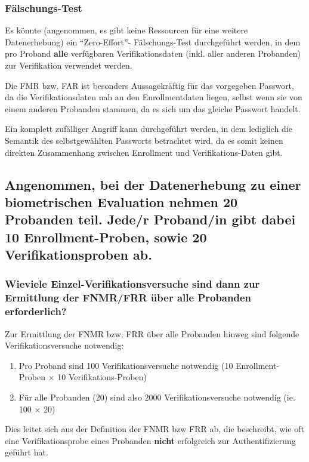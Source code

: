 \documentclass{article}
\begin{document}
\subsubsection*{Fälschungs-Test}

Es könnte (angenommen, es gibt keine Ressourcen für eine weitere Datenerhebung) ein ``Zero-Effort''-
Fälschungs-Test durchgeführt werden, in dem pro Proband \textbf{alle} verfügbaren Verifikationsdaten 
(inkl. aller anderen Probanden) zur Verifikation verwendet werden.

Die FMR bzw. FAR ist besonders Aussagekräftig für das vorgegeben Passwort, da die Verifikationsdaten nah
an den Enrollmentdaten liegen, selbst wenn sie von einem anderen Probanden stammen, da es sich um das 
gleiche Passwort handelt. 

Ein komplett zufälliger Angriff kann durchgeführt werden, in dem lediglich die Semantik des 
selbstgewählten Passworts betrachtet wird, da es somit keinen direkten Zusammenhang zwischen
Enrollment und Verifikations-Daten gibt.

\subsection{Angenommen, bei der Datenerhebung zu einer biometrischen Evaluation nehmen 20 Probanden teil. Jede/r Proband/in gibt dabei 10 Enrollment-Proben, sowie 20 Verifikationsproben ab.}

\subsubsection{Wieviele Einzel-Verifikationsversuche sind dann zur Ermittlung der FNMR/FRR über alle Probanden erforderlich?}

Zur Ermittlung der FNMR bzw. FRR über alle Probanden hinweg sind folgende Verifikationsversuche notwendig:

\begin{enumerate}
	\item Pro Proband sind 100 Verifikationsversuche notwendig (10 Enrollment-Proben $\times$ 10 Verifikations-Proben)
	\item Für alle Probanden (20) sind also 2000 Verifikationsversuche notwendig (ie. 100 $\times$ 20)
\end{enumerate}

Dies leitet sich aus der Definition der FNMR bzw FRR ab, die beschreibt, wie oft eine Verifikationsprobe
eines Probanden \textbf{nicht} erfolgreich zur Authentifizierung geführt hat.
\end{document}
